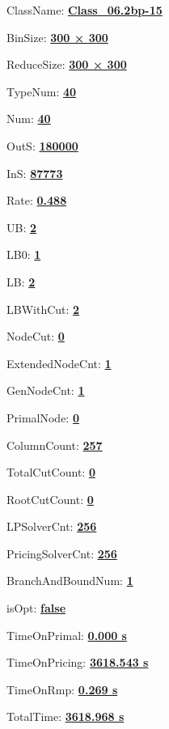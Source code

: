 \documentclass[11pt]{article}
\begin{document}
\pagestyle{empty}


ClassName: \underline{\textbf{Class_06.2bp-15}}
\par
BinSize: \underline{\textbf{300 × 300}}
\par
ReduceSize: \underline{\textbf{300 × 300}}
\par
TypeNum: \underline{\textbf{40}}
\par
Num: \underline{\textbf{40}}
\par
OutS: \underline{\textbf{180000}}
\par
InS: \underline{\textbf{87773}}
\par
Rate: \underline{\textbf{0.488}}
\par
UB: \underline{\textbf{2}}
\par
LB0: \underline{\textbf{1}}
\par
LB: \underline{\textbf{2}}
\par
LBWithCut: \underline{\textbf{2}}
\par
NodeCut: \underline{\textbf{0}}
\par
ExtendedNodeCnt: \underline{\textbf{1}}
\par
GenNodeCnt: \underline{\textbf{1}}
\par
PrimalNode: \underline{\textbf{0}}
\par
ColumnCount: \underline{\textbf{257}}
\par
TotalCutCount: \underline{\textbf{0}}
\par
RootCutCount: \underline{\textbf{0}}
\par
LPSolverCnt: \underline{\textbf{256}}
\par
PricingSolverCnt: \underline{\textbf{256}}
\par
BranchAndBoundNum: \underline{\textbf{1}}
\par
isOpt: \underline{\textbf{false}}
\par
TimeOnPrimal: \underline{\textbf{0.000 s}}
\par
TimeOnPricing: \underline{\textbf{3618.543 s}}
\par
TimeOnRmp: \underline{\textbf{0.269 s}}
\par
TotalTime: \underline{\textbf{3618.968 s}}
\par
\newpage
\end{document}
